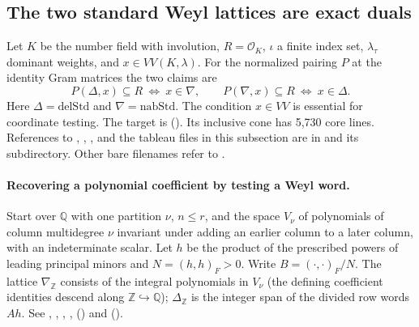 \subsection{The two standard Weyl lattices are exact duals}\label{r12:weyl}

Let $K$ be the number field with involution, $R=\mathcal O_K$,
$\iota$ a finite index set, $\lambda_\tau$ dominant weights, and
$x\in VV(K,\lambda)$. For the normalized pairing $P$ at the identity
Gram matrices the two claims are
\[
  P(\Delta,x)\subseteq R\ \Longleftrightarrow\ x\in\nabla,
  \qquad P(\nabla,x)\subseteq R\ \Longleftrightarrow\ x\in\Delta .
\]
Here $\Delta=\mathrm{delStd}$ and $\nabla=\mathrm{nabStd}$.
The condition $x\in VV$ is essential for coordinate testing.
The target is 
(). Its inclusive
cone has 5,730 core lines. References to ,
, , and the tableau files
in this subsection are in 
and its  subdirectory. Other bare filenames refer
to .

\paragraph{Recovering a polynomial coefficient by testing a Weyl word.}
Start over $\mathbb Q$ with one partition $\nu$, $n\le r$, and the
space $V_\nu$ of polynomials of column multidegree $\nu$ invariant
under adding an earlier column to a later column, with an indeterminate
scalar. Let $h$ be the product of the prescribed powers of leading
principal minors and $N=(h,h)_F>0$. Write
$B=(\cdot,\cdot)_F/N$. The lattice $\nabla_{\mathbb Z}$ consists of
the integral polynomials in $V_\nu$ (the defining coefficient identities
descend along $\mathbb Z\hookrightarrow\mathbb Q$);
$\Delta_{\mathbb Z}$ is the integer span of the divided row words $Ah$.
See , , , ,
 () and 
().

